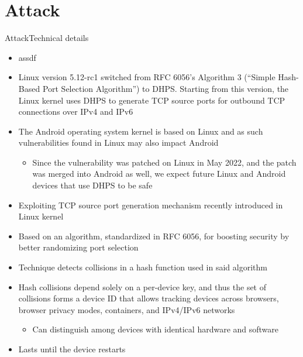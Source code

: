 \documentclass[aspectratio=169, hyperref={colorlinks=true, allcolors=SecondaryColor}, c]{beamer}
\begin{document}
\section{Attack}

\begin{frame}[fragile]{Attack}{Technical details}
	\ifbeamer
		\begin{itemize}
			\item assdf
		\end{itemize}
	\else
		\begin{itemize}
			\item Linux version 5.12-rc1 switched from RFC 6056’s Algorithm 3 (\enquote{Simple Hash-Based Port Selection Algorithm}) to DHPS. Starting from this version, the Linux kernel uses DHPS to generate TCP source ports for outbound TCP connections over IPv4 and IPv6
			\item The Android operating system kernel is based on Linux and as such vulnerabilities found in Linux may also impact Android
			\begin{itemize}
				\item Since the vulnerability was patched on Linux in May 2022, and the patch was merged into Android as well, we expect future Linux and Android devices that use DHPS to be safe
			\end{itemize}
			\item Exploiting TCP source port generation mechanism recently introduced in Linux kernel
			\item Based on an algorithm, standardized in RFC 6056, for boosting security by better randomizing port selection
			\item Technique detects collisions in a hash function used in said algorithm
			\item Hash collisions depend solely on a per-device key, and thus the set of collisions forms a device ID that allows tracking devices across browsers, browser privacy modes, containers, and IPv4/IPv6 networks
			\begin{itemize}
				\item Can distinguish among devices with identical hardware and software
			\end{itemize}
			\item Lasts until the device restarts

\end{itemize}
\end{frame}
\end{document}
